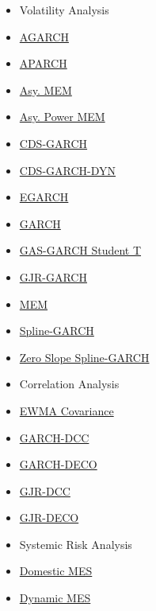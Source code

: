 \documentclass[]{tufte-book}
\begin{document}
\begin{itemize}
  \begin{itemize}
  \item
    Volatility Analysis
  \item
    \href{https://vlab.stern.nyu.edu/doc/6?topic=mdls\%3C/span\%3E}{AGARCH}
  \item
    \href{https://vlab.stern.nyu.edu/doc/5?topic=mdls}{{APARCH}}
  \item
    \href{https://vlab.stern.nyu.edu/doc/10?topic=mdls}{{Asy. MEM}}
  \item
    \href{https://vlab.stern.nyu.edu/doc/11?topic=mdls}{{Asy. Power
    MEM}}
  \item
    \href{https://vlab.stern.nyu.edu/doc/25?topic=mdls}{{CDS-GARCH}}
  \item
    \href{https://vlab.stern.nyu.edu/doc/26?topic=mdls}{{CDS-GARCH-DYN}}
  \item
    \href{https://vlab.stern.nyu.edu/doc/4?topic=mdls}{{EGARCH}}
  \item
    \href{https://vlab.stern.nyu.edu/doc/2?topic=mdls}{{GARCH}}
  \item
    \href{https://vlab.stern.nyu.edu/doc/23?topic=mdls}{{GAS-GARCH
    Student T}}
  \item
    \href{https://vlab.stern.nyu.edu/doc/3?topic=mdls}{{GJR-GARCH}}
  \item
    \href{https://vlab.stern.nyu.edu/doc/9?topic=mdls}{{MEM}}
  \item
    \href{https://vlab.stern.nyu.edu/doc/7?topic=mdls}{{Spline-GARCH}}
  \item
    \href{https://vlab.stern.nyu.edu/doc/8?topic=mdls}{{Zero Slope
    Spline-GARCH}}
  \item
    Correlation Analysis
  \item
    \href{https://vlab.stern.nyu.edu/doc/12?topic=mdls}{{EWMA
    Covariance}}
  \item
    \href{https://vlab.stern.nyu.edu/doc/13?topic=mdls}{{GARCH-DCC}}
  \item
    \href{https://vlab.stern.nyu.edu/doc/20?topic=mdls}{{GARCH-DECO}}
  \item
    \href{https://vlab.stern.nyu.edu/doc/14?topic=mdls}{{GJR-DCC}}
  \item
    \href{https://vlab.stern.nyu.edu/doc/21?topic=mdls}{{GJR-DECO}}
  \item
    Systemic Risk Analysis
  \item
    \href{https://vlab.stern.nyu.edu/doc/40?topic=mdls}{{Domestic MES}}
  \item
    \href{https://vlab.stern.nyu.edu/doc/16?topic=mdls}{{Dynamic MES}}

\end{itemize}
\end{itemize}
\end{document}

